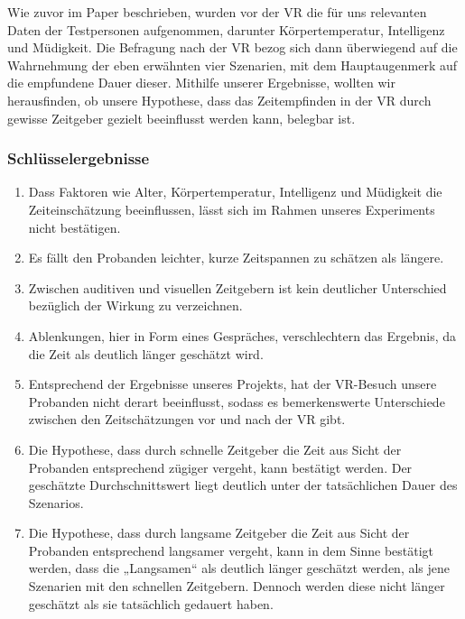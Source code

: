 \documentclass{Bericht}
\begin{document}
Wie zuvor im Paper beschrieben, wurden vor der VR  die für uns relevanten Daten der Testpersonen aufgenommen, darunter Körpertemperatur, Intelligenz und Müdigkeit. Die Befragung nach der VR bezog sich dann überwiegend auf die Wahrnehmung der eben erwähnten vier Szenarien, mit dem Hauptaugenmerk auf die empfundene Dauer dieser. Mithilfe unserer Ergebnisse, wollten wir herausfinden, ob unsere Hypothese, dass das Zeitempfinden in der VR durch gewisse Zeitgeber gezielt beeinflusst werden kann, belegbar ist.

\subsubsection{Schlüsselergebnisse}
	\begin{enumerate}
		\item Dass Faktoren wie Alter, Körpertemperatur, Intelligenz und Müdigkeit die Zeiteinschätzung beeinflussen, lässt sich im Rahmen unseres Experiments nicht bestätigen.


		\item Es fällt den Probanden leichter, kurze Zeitspannen zu schätzen als längere.
		\item Zwischen auditiven und visuellen Zeitgebern ist kein deutlicher Unterschied bezüglich der Wirkung zu verzeichnen.
		\item Ablenkungen, hier in Form eines Gespräches, verschlechtern das Ergebnis, da die Zeit als deutlich länger geschätzt wird. 
		\item Entsprechend der Ergebnisse unseres Projekts, hat der VR-Besuch unsere Probanden nicht derart beeinflusst, sodass es bemerkenswerte Unterschiede zwischen den Zeitschätzungen vor und nach der VR gibt.
		\item Die Hypothese, dass durch schnelle Zeitgeber die Zeit aus Sicht der Probanden entsprechend zügiger vergeht, kann bestätigt werden. Der geschätzte Durchschnittswert liegt  deutlich unter der tatsächlichen Dauer des Szenarios.
		\item Die Hypothese, dass durch langsame Zeitgeber die Zeit aus Sicht der Probanden entsprechend langsamer vergeht, kann in dem Sinne bestätigt werden, dass die „Langsamen“ als deutlich länger geschätzt werden, als jene Szenarien mit den schnellen Zeitgebern. Dennoch werden diese nicht länger geschätzt als sie tatsächlich gedauert haben.
	\end{enumerate}
\end{document}
